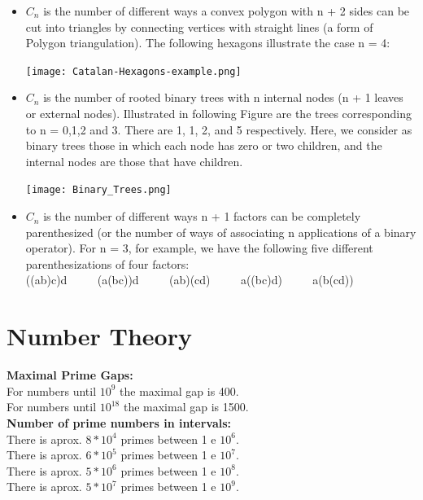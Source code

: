 \documentclass[10pt, twocolumn]{article}
\begin{document}
\begin{flushleft}
\begin{itemize}
\item $C_n$ is the number of different ways a convex polygon with n + 2 sides can be cut into triangles by connecting vertices with straight lines (a form of Polygon triangulation). The following hexagons illustrate the case n = 4:
\begin{center}
\texttt{[image: Catalan-Hexagons-example.png]}
\end{center}


\item $C_n$ is the number of rooted binary trees with n internal nodes (n + 1 leaves or external nodes). Illustrated in following Figure are the trees corresponding to n = 0,1,2 and 3. There are 1, 1, 2, and 5 respectively. Here, we consider as binary trees those in which each node has zero or two children, and the internal nodes are those that have children.
\begin{center}
\texttt{[image: Binary\_Trees.png]}
\end{center}


\item $C_n$ is the number of different ways n + 1 factors can be completely parenthesized (or the number of ways of associating n applications of a binary operator). For n = 3, for example, we have the following five different parenthesizations of four factors:\\
((ab)c)d  $\qquad$  (a(bc))d  $\qquad$  (ab)(cd)  $\qquad$  a((bc)d)  $\qquad$  a(b(cd))

\end{itemize}


\section{Number Theory}

\textbf{Maximal Prime Gaps:}\\
For numbers until $10^9$ the maximal gap is 400.\\
For numbers until $10^{18}$ the maximal gap is 1500.\\[0.5cm]

\textbf{Number of prime numbers in intervals:}\\
There is aprox. $8*10^4$ primes between 1 e $10^6$.\\
There is aprox. $6*10^5$ primes between 1 e $10^7$.\\
There is aprox. $5*10^6$ primes between 1 e $10^8$.\\
There is aprox. $5*10^7$ primes between 1 e $10^9$.\\[0.5cm]




\end{flushleft}
\end{document}
